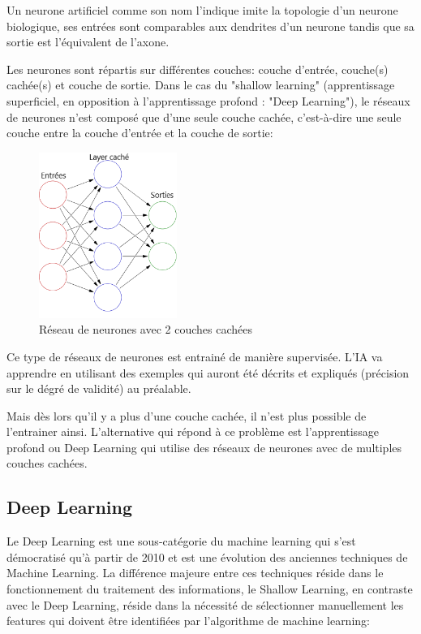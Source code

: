             Un neurone artificiel comme son nom l'indique imite la topologie d'un neurone biologique,
            ses entrées sont comparables aux dendrites d'un neurone tandis que sa
            sortie est l'équivalent de l'axone. \newline

            Les neurones sont répartis sur différentes couches: couche d'entrée, couche(s) cachée(s)
            et couche de sortie. Dans le cas du "shallow learning" (apprentissage superficiel,
            en opposition à l'apprentissage profond : "Deep Learning"), le réseaux de neurones
            n'est composé que d'une seule couche cachée, c'est-à-dire une seule couche entre
            la couche d'entrée et la couche de sortie:

            \begin{figure}[H]
                \centering
                \includegraphics[width=0.4\textwidth]{Images/shallownnoverview}
                \caption{Réseau de neurones avec 2 couches cachées}
                \label{fig:NN2Layers}
            \end{figure}

            Ce type de réseaux de neurones est entrainé de manière supervisée.
            L'IA va apprendre en utilisant des exemples qui auront été décrits
            et expliqués (précision sur le dégré de validité) au préalable.

            Mais dès lors qu'il y a plus d'une couche cachée,
            il n'est plus possible de l'entrainer ainsi.
            L'alternative qui répond à ce problème est l'apprentissage profond ou
            Deep Learning qui utilise des réseaux de neurones avec de multiples couches
            cachées.


        \subsection{Deep Learning}
            Le Deep Learning est une sous-catégorie du machine learning qui s'est démocratisé
            qu'à partir de 2010 et est une évolution des anciennes techniques de Machine Learning.
            La différence majeure entre ces techniques réside dans le fonctionnement du traitement des
            informations, le Shallow Learning, en contraste avec le Deep
            Learning, réside dans la nécessité de sélectionner manuellement les features
            qui doivent être identifiées par l'algorithme de machine learning:

